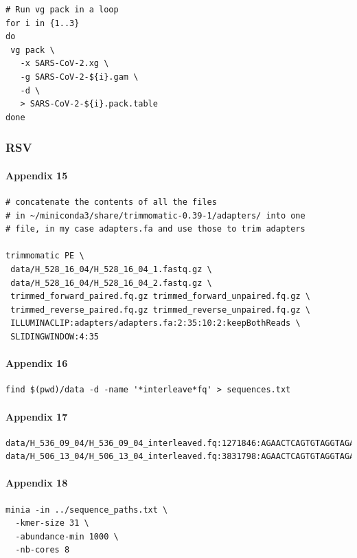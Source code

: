 \documentclass[10pt, a4paper]{article}
\begin{document}
\begin{appendices}
\begin{verbatim}
# Run vg pack in a loop
for i in {1..3}
do 
 vg pack \
   -x SARS-CoV-2.xg \
   -g SARS-CoV-2-${i}.gam \
   -d \
   > SARS-CoV-2-${i}.pack.table
done
\end{verbatim}

\subsubsection{RSV}
\label{sec:org87747d5}
\paragraph{Appendix 15}
\label{sec:org4cb77cb}
\begin{verbatim}
# concatenate the contents of all the files
# in ~/miniconda3/share/trimmomatic-0.39-1/adapters/ into one
# file, in my case adapters.fa and use those to trim adapters

trimmomatic PE \
 data/H_528_16_04/H_528_16_04_1.fastq.gz \
 data/H_528_16_04/H_528_16_04_2.fastq.gz \
 trimmed_forward_paired.fq.gz trimmed_forward_unpaired.fq.gz \
 trimmed_reverse_paired.fq.gz trimmed_reverse_unpaired.fq.gz \
 ILLUMINACLIP:adapters/adapters.fa:2:35:10:2:keepBothReads \
 SLIDINGWINDOW:4:35
\end{verbatim}

\paragraph{Appendix 16}
\label{sec:orgc3d26ce}
\begin{verbatim}
find $(pwd)/data -d -name '*interleave*fq' > sequences.txt
\end{verbatim}

\paragraph{Appendix 17}
\label{sec:orgd29e45f}
\begin{verbatim}
data/H_536_09_04/H_536_09_04_interleaved.fq:1271846:AGAACTCAGTGTAGGTAGAATGGTTGGCTGATCAATATCTCTAATGATTTTGGTCTGTGAATCAACTGTCATAAGAGAATTCTATCAAAGTTGAATTCCGAATCCTTGGGTCAATGACTGGGTGCACCCATTCTTCTAATGTGCTCTGTC
data/H_506_13_04/H_506_13_04_interleaved.fq:3831798:AGAACTCAGTGTAGGTAGAATGGTTGGCTGAGTAGGTAGATGGAGGCAGGTGCATGTGTGATGGGAAGTGTGGTGACGGGTTGTGTGGGCACACGGGATGAGGCGCAGATGGCTGGGGGTTTGGGAGGGGAATGGGTGGGAGAAGGAGGC
\end{verbatim}

\paragraph{Appendix 18}
\label{sec:orgae97f89}
\begin{verbatim}
minia -in ../sequence_paths.txt \
  -kmer-size 31 \
  -abundance-min 1000 \
  -nb-cores 8
\end{verbatim}


\end{appendices}
\end{document}
